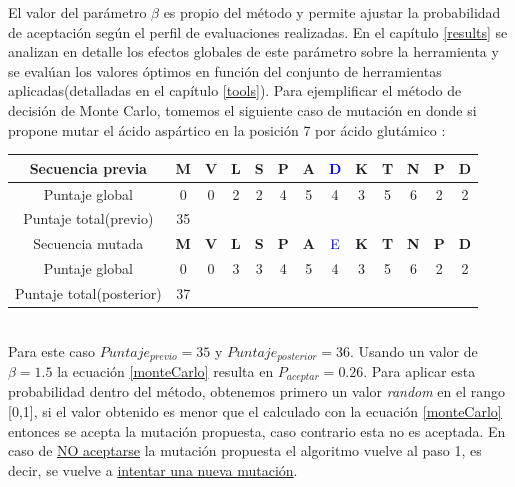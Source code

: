 \begin{enumerate}
    El valor del parámetro $\beta$ es propio del método y permite ajustar la probabilidad de aceptación según el perfil de evaluaciones realizadas. 
    En el capítulo \ref{results} se analizan en detalle los efectos globales de este parámetro sobre la herramienta y se evalúan los valores óptimos en función del conjunto de herramientas aplicadas(detalladas en el capítulo \ref{tools}).
    Para ejemplificar el método de decisión de Monte Carlo, tomemos el siguiente caso de mutación en donde si propone mutar el ácido aspártico en la posición 7 por ácido glutámico :
    
      \vspace{0.3cm}
       \begin{tabular}{ccccccccccccc}\hline
	Secuencia previa &  \textbf{M} & \textbf{V} & \textbf{L} & \textbf{S} & \textbf{P} & \textbf{A} & \textcolor{blue}{D} & \textbf{K} & \textbf{T} & \textbf{N} & \textbf{P} & \textbf{D} \\ \hline
	Puntaje global & 0 & 0 & 2 & 2 & 4 & 5 & 4 & 3 & 5 & 6 & 2 & 2\\  \hline
       Puntaje total(previo) & 35 \\ \hline \hline 
       Secuencia mutada  &  \textbf{M} & \textbf{V} & \textbf{L} & \textbf{S} & \textbf{P} & \textbf{A} & \textcolor{blue}{E}& \textbf{K} & \textbf{T} & \textbf{N} & \textbf{P} & \textbf{D}\\  \hline
	Puntaje global & 0 & 0 & 3 & 3 & 4 & 5 & 4 & 3 & 5 & 6 & 2 & 2\\  \hline
       Puntaje total(posterior) & 37 \\ \hline
      \end{tabular}\\
    
    Para este caso $Puntaje_{previo}=35$ y $Puntaje_{posterior}=36$. Usando un valor de $\beta=1.5$ la ecuación \ref{monteCarlo} resulta en $P_{aceptar} = 0.26$.
    Para aplicar esta probabilidad dentro del método, obtenemos primero un valor \textit{random} en el rango [0,1], si el valor obtenido es menor que el calculado con la ecuación \ref{monteCarlo} entonces se acepta la mutación propuesta, 
    caso contrario esta no es aceptada. 
    En caso de \underline{NO aceptarse} la mutación propuesta el algoritmo vuelve al paso 1, es decir, se vuelve a \underline{intentar una nueva mutación}. 
        
\end{enumerate} 




